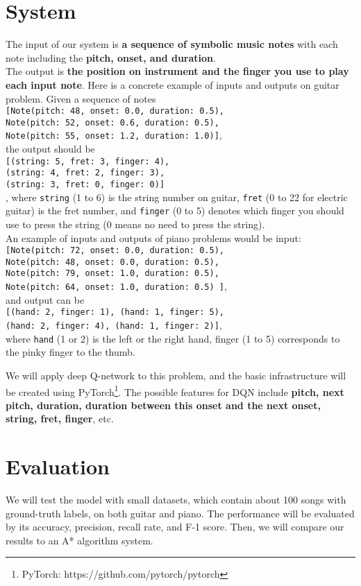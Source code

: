 \documentclass[12pt]{article}
\begin{document}
\section*{System}
The input of our system is \textbf{a sequence of symbolic music notes} with each note including the \textbf{pitch, onset, and duration}. \\
The output is \textbf{the position on instrument and the finger you use to play each input note}. Here is a concrete example of inputs and outputs on guitar problem. Given a sequence of notes \\
\texttt{[Note(pitch: 48, onset: 0.0, duration: 0.5), \\Note(pitch: 52, onset: 0.6, duration: 0.5), \\Note(pitch: 55, onset: 1.2, duration: 1.0)]}, \\
the output should be \\ 
\texttt{[(string: 5, fret: 3, finger: 4), \\(string: 4, fret: 2, finger: 3), \\(string: 3, fret: 0, finger: 0)]} \\
, where \texttt{string} (1 to 6) is the string number on guitar, \texttt{fret} (0 to 22 for electric guitar) is the fret number, and \texttt{finger} (0 to 5) denotes which finger you should use to press the string (0 means no need to press the string). \\
An example of inputs and outputs of piano problems would be input: \\
\texttt{[Note(pitch: 72, onset: 0.0, duration: 0.5), \\Note(pitch: 48, onset: 0.0, duration: 0.5), \\Note(pitch: 79, onset: 1.0, duration: 0.5), \\Note(pitch: 64, onset: 1.0, duration: 0.5) ]}, \\
and output can be \\
\texttt{[(hand: 2, finger: 1), (hand: 1, finger: 5), \\(hand: 2, finger: 4), (hand: 1, finger: 2)]}, \\
where \texttt{hand} (1 or 2) is the left or the right hand, {finger} (1 to 5) corresponds to the pinky finger to the thumb.

We will apply deep Q-network to this problem, and the basic infrastructure will be created using PyTorch\footnote{PyTorch: https://github.com/pytorch/pytorch}. The possible features for DQN include \textbf{pitch, next pitch, duration, duration between this onset and the next onset, string, fret, finger}, etc.

\section*{Evaluation}
We will test the model with small datasets, which contain about 100 songs with ground-truth labels, on both guitar and piano. The performance will be evaluated by its accuracy, precision, recall rate, and F-1 score. Then, we will compare our results to an A* algorithm system. 




\end{document}
